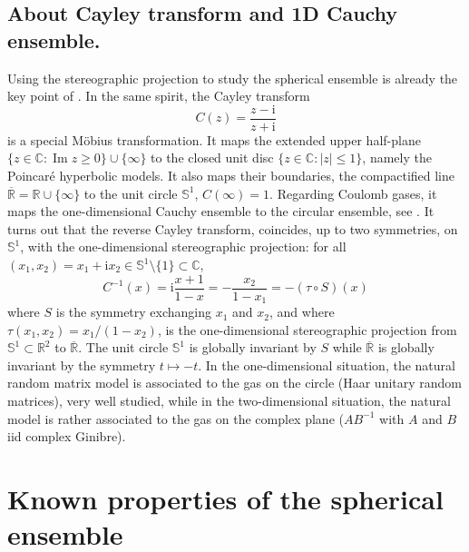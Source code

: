\documentclass[10pt,reqno]{amsart}
\numberwithin{equation}{section}
\numberwithin{figure}{section}
\theoremstyle{plain}
\newcommand{\<}{\langle}
\renewcommand{\>}{\rangle}
\renewcommand{\Im}{\operatorname{Im}}
\begin{document}
\subsection{About Cayley transform and 1D Cauchy ensemble.}
Using the stereographic projection to study the spherical ensemble is
already the key point of \cite{MR2926763,chafai-garcia-zelada-xu}. In the same spirit, the Cayley transform
\begin{equation}
  C(z)=\frac{z-\mathrm{i}}{z+\mathrm{i}}
\end{equation}
is a special Möbius transformation. It maps the extended upper half-plane
$\{z\in\mathbb{C}:\Im z\geq0\}\cup\{\infty\}$ to the closed unit disc
$\{z\in\mathbb{C}:|z|\leq1\}$, namely the Poincaré hyperbolic models. It also maps their boundaries, the compactified line
$\overline{\mathbb{R}}=\mathbb{R}\cup\{\infty\}$ to the unit circle
$\mathbb{S}^1$, $C(\infty)=1$. Regarding Coulomb gases, it maps the one-dimensional Cauchy ensemble to the circular ensemble, see \cite{MR2559435}. It turns out that
the reverse Cayley transform, coincides, up to two symmetries, on
$\mathbb{S}^1$, with the one-dimensional stereographic projection:
for all $(x_1,x_2)=x_1+\mathrm{i}x_2\in\mathbb{S}^1\setminus\{1\}\subset\mathbb{C}$,
\begin{equation}
  C^{-1}(x)=\mathrm{i}\frac{x+1}{1-x}=-\frac{x_2}{1-x_1}=-(\tau\circ S)(x)
\end{equation}
where $S$ is the symmetry exchanging $x_1$ and $x_2$, and where $\tau(x_1,x_2)=x_1/(1-x_2)$, is the one-dimensional stereographic projection from $\mathbb{S}^1\subset\mathbb{R}^2$ to $\overline{\mathbb{R}}$. The unit circle
$\mathbb{S}^1$ is globally invariant by $S$ while $\overline{\mathbb{R}}$ is
globally invariant by the symmetry $t\mapsto -t$. In the one-dimensional
situation, the natural random matrix model is associated to the gas on the
circle (Haar unitary random matrices), very well studied, while in the
two-dimensional situation, the natural model is rather associated to the gas
on the complex plane ($AB^{-1}$ with $A$ and $B$ iid complex Ginibre).

\section{Known properties of the spherical ensemble}
\label{se:properties}
\end{document}
